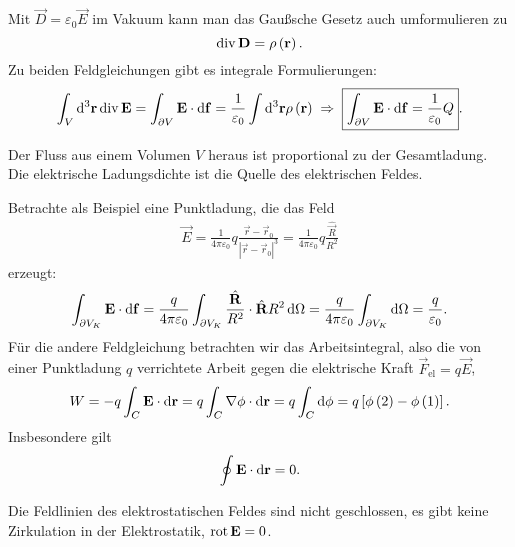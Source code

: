 Mit $\vec {D}=\varepsilon _{0}\vec {E}$ im Vakuum kann man das Gaußsche Gesetz auch umformulieren zu
\begin{equation}
	\label{3.6}
	\operatorname{div} \mathbf{D}=\rho \left(\mathbf{r}\right).
\end{equation}
Zu beiden Feldgleichungen gibt es integrale Formulierungen:
\begin{equation*}
	\int _{V}\mathop{}\!\mathrm{d} ^{3}\mathbf{r}\operatorname{div} \mathbf{E}=\int _{\partial V}\mathbf{E}\cdot \mathop{}\!\mathrm{d} \mathbf{f}=\frac{1}{\varepsilon _{0}}\int \mathop{}\!\mathrm{d} ^{3}\mathbf{r}\rho \left(\mathbf{r}\right)\;\Rightarrow\; \boxed{\int _{\partial V}\mathbf{E}\cdot \mathop{}\!\mathrm{d} \mathbf{f}=\frac{1}{\varepsilon _{0}}Q}.
\end{equation*}
\begin{formal}
	Der Fluss aus einem Volumen $V$ heraus ist proportional zu der Gesamtladung. Die elektrische Ladungsdichte ist die Quelle des elektrischen Feldes.
\end{formal}
Betrachte als Beispiel eine Punktladung, die das Feld
\begin{align*}
	\vec {E}=\frac{1}{4\pi \varepsilon _{0}}q\frac{\vec {r}-\vec {r}_{0}}{\left| \vec {r}-\vec {r}_{0}\right| ^{3}}=\frac{1}{4\pi \varepsilon _{0}}q\frac{\hat{\vec {R}}}{R^{2}}
\end{align*}
erzeugt:
\begin{equation*}
	\int _{\partial V_{K}}\mathbf{E}\cdot \mathop{}\!\mathrm{d} \mathbf{f}=\frac{q}{4\pi \varepsilon _{0}}\int _{\partial V_{K}}\frac{\hat{\mathbf{R}}}{R^{2}}\cdot \hat{\mathbf{R}}R^{2}\mathop{}\!\mathrm{d} \Omega  =\frac{q}{4\pi \varepsilon _{0}}\int _{\partial V_{K}}\mathop{}\!\mathrm{d} \Omega  =\frac{q}{\varepsilon _{0}}.
\end{equation*}
Für die andere Feldgleichung betrachten wir das Arbeitsintegral, also die von einer Punktladung $q$ verrichtete Arbeit gegen die elektrische Kraft $\vec F_{\mathrm{el}}=q\vec {E}$,
\begin{equation*}
	W=-q\int _{C}\mathbf{E}\cdot \mathop{}\!\mathrm{d} \mathbf{r}=q\int _{C}\nabla \phi \cdot \mathop{}\!\mathrm{d} \mathbf{r}=q\int _{C}\mathop{}\!\mathrm{d} \phi =q\left[\phi \left(2\right)-\phi \left(1\right)\right].
\end{equation*}
Insbesondere gilt
\begin{equation}
	\label{3.7}
	\oint \mathbf{E}\cdot \mathop{}\!\mathrm{d} \mathbf{r}=0.
\end{equation}

\begin{formal}
	Die Feldlinien des elektrostatischen Feldes sind nicht geschlossen, es gibt keine Zirkulation in der Elektrostatik, $\operatorname{rot} \mathbf{E}=0$.
\end{formal}



